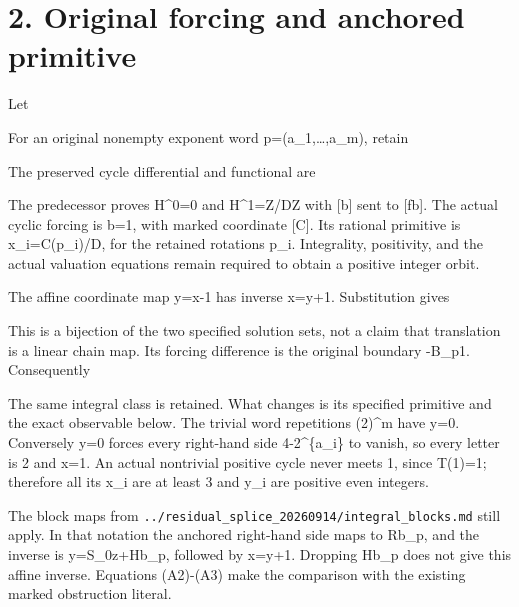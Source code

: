 \section{2. Original forcing and anchored primitive}

Let


For an original nonempty exponent word p=(a\_1,\ldots,a\_m), retain


The preserved cycle differential and functional are


The predecessor proves H\^{}0=0 and H\^{}1=Z/DZ with {[}b{]} sent to
{[}fb{]}. The actual cyclic forcing is b=1, with marked coordinate
{[}C{]}. Its rational primitive is x\_i=C(p\_i)/D, for the retained
rotations p\_i. Integrality, positivity, and the actual valuation
equations remain required to obtain a positive integer orbit.

The affine coordinate map y=x-1 has inverse x=y+1. Substitution gives


This is a bijection of the two specified solution sets, not a claim that
translation is a linear chain map. Its forcing difference is the
original boundary -B\_p1. Consequently


The same integral class is retained. What changes is its specified
primitive and the exact observable below. The trivial word repetitions
(2)\^{}m have y=0. Conversely y=0 forces every right-hand side
4-2\^{}\{a\_i\} to vanish, so every letter is 2 and x=1. An actual
nontrivial positive cycle never meets 1, since T(1)=1; therefore all its
x\_i are at least 3 and y\_i are positive even integers.

The block maps from
\nolinkurl{../residual_splice_20260914/integral_blocks.md} still apply.
In that notation the anchored right-hand side maps to Rb\_p, and the
inverse is y=S\_0z+Hb\_p, followed by x=y+1. Dropping Hb\_p does not
give this affine inverse. Equations (A2)-(A3) make the comparison with
the existing marked obstruction literal.

